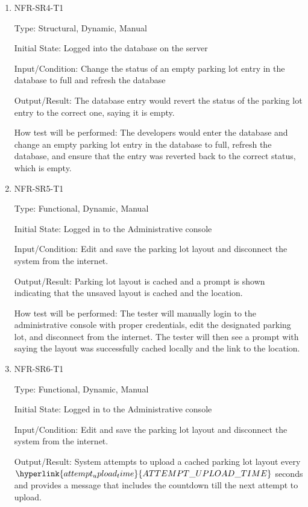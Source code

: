 \documentclass[12pt, titlepage]{article}
\begin{document}
\begin{enumerate}

\item{NFR-SR4-T1}

Type: Structural, Dynamic, Manual
					
Initial State: Logged into the database on the server
					
Input/Condition: Change the status of an empty parking lot entry in the database
to full and refresh the database
					
Output/Result: The database entry would revert the status of the parking lot
entry to the correct one, saying it is empty.

How test will be performed: The developers would enter the database and change
an empty parking lot entry in the database to full, refresh the database, and
ensure that the entry was reverted back to the correct status, which is empty.

\item{NFR-SR5-T1}

Type: Functional, Dynamic, Manual
					
Initial State: Logged in to the Administrative console
					
Input/Condition: Edit and save the parking lot layout and disconnect the system
from the internet.
					
Output/Result: Parking lot layout is cached and a prompt is shown indicating
that the unsaved layout is cached and the location.

How test will be performed: The tester will manually login to the administrative
console with proper credentials, edit the designated parking lot, and disconnect
from the internet. The tester will then see a prompt with saying the layout was
successfully cached locally and the link to the location.

\item{NFR-SR6-T1}

Type: Functional, Dynamic, Manual
					
Initial State: Logged in to the Administrative console
					
Input/Condition: Edit and save the parking lot layout and disconnect the system
from the internet.
					
Output/Result: System attempts to upload a cached parking lot layout every
\\$\hyperlink{attempt_upload_time}{ATTEMPT\_UPLOAD\_TIME}$ seconds and provides
a message that includes the countdown till the next attempt to upload.


\end{enumerate}
\end{document}
